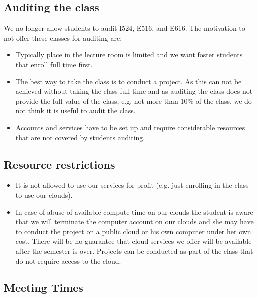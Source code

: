 \begin{itemize}
\subsection{Auditing the class}\label{auditing-the-class}

We no longer allow students to audit I524, E516, and E616. The
motivation to not offer these classes for auditing are:

\begin{itemize}
\item  Typically place in the lecture room
is limited and we want foster students that enroll full time first.

\item The best way to take the class is to conduct a project. As this can
not be achieved without taking the class full time and as auditing the
class does not provide the full value of the class, e.g. not more than
10\% of the class, we do not think it is useful to audit the class.

\item  Accounts and services have to be set up and require
  considerable resources that are not covered by students auditing.

\end{itemize}


\subsection{Resource restrictions}

\begin{itemize}
\item It is not allowed to use our services for profit (e.g. just
  enrolling in the class to use our clouds).
\item In case of abuse of available compute time on our clouds the
  student is aware that we will terminate the computer account on our
  clouds and she may have to conduct the project on a public cloud or
  his own computer under her own cost. There will be no guarantee that
  cloud services we offer will be available after the semester is
  over.  Projects can be conducted as part of the class that do not
  require access to the cloud.
\end{itemize}

\subsection{Meeting Times}\label{meeting-times}


\end{itemize}
